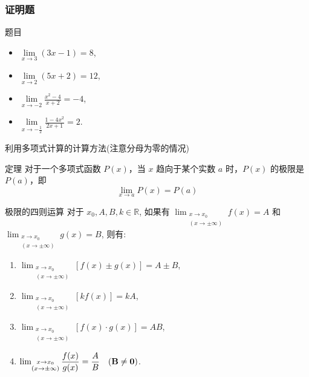 \documentclass[
10pt,
aspectratio=43,
]{beamer}
\begin{document}
\begin{frame}
	\frametitle{证明题}

	\begin{block}{题目}
		\begin{itemize}
			\item $\lim\limits_{x \to 3}(3x-1)=8$,
			\item $\lim\limits_{x \to 2}(5x+2)=12$,
			\item $\lim\limits_{x \to -2} \displaystyle\frac{x^2-4}{x+2}=-4$,
			\item $\lim\limits_{x \to -\frac{1}{2}} \displaystyle\frac{1-4x^2}{2x+1}=2$.
		\end{itemize}
	\end{block}
\end{frame}

\begin{frame}{利用多项式计算的计算方法(注意分母为零的情况)}
	\begin{exampleblock}{定理}
		对于一个多项式函数 $P(x)$，当 $x$ 趋向于某个实数 $a$ 时，$P(x)$ 的极限是 $P(a)$，即
		\[
			\lim_{x \to a} P(x) = P(a)
		\]
	\end{exampleblock}
	\begin{block}{极限的四则运算}
		对于 $x_0,  A,  B,  k \in \mathbb{R}$,  如果有 $\lim _{\substack{x \rightarrow x_0 \\(x \rightarrow \pm\infty)}} f(x)=A$ 和 $ \lim _{\substack{x \rightarrow x_0 \\(x \rightarrow \pm\infty)}} g(x)=B$,   则有:

		\begin{enumerate}
			\item $\lim _{\substack{x \rightarrow x_0 \\(x \rightarrow \pm\infty)}}[f(x) \pm g(x)]=A \pm B$,  \\
			\item
			      $\lim _{\substack{x \rightarrow x_0 \\(x \rightarrow \pm\infty)}}[k f(x)]=k A$,  \\
			\item $\lim _{\substack{x \rightarrow x_0 \\(x \rightarrow\pm \infty)}}[f(x) \cdot g(x)]=A B$,  \\
			\item $\lim _{\substack{x \rightarrow x_0 \\(x \rightarrow\pm \infty)}} \displaystyle\frac{f(x)}{g(x)}=\frac{A}{B} \quad{\bf(B \neq 0)}$.
		\end{enumerate}
	\end{block}
\end{frame}
\end{document}

